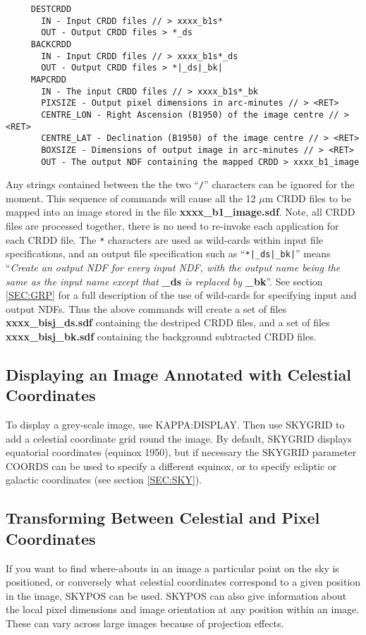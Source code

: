 \small
\begin{verbatim}
     DESTCRDD
       IN - Input CRDD files // > xxxx_b1s*
       OUT - Output CRDD files > *_ds
     BACKCRDD
       IN - Input CRDD files // > xxxx_b1s*_ds
       OUT - Output CRDD files > *|_ds|_bk|
     MAPCRDD
       IN - The input CRDD files // > xxxx_b1s*_bk
       PIXSIZE - Output pixel dimensions in arc-minutes // > <RET>
       CENTRE_LON - Right Ascension (B1950) of the image centre // > <RET>
       CENTRE_LAT - Declination (B1950) of the image centre // > <RET>
       BOXSIZE - Dimensions of output image in arc-minutes // > <RET>
       OUT - The output NDF containing the mapped CRDD > xxxx_b1_image
\end{verbatim}
\normalsize

Any strings contained between the the two ``\verb+/+'' characters can be ignored
for the moment.
This sequence of commands will cause all the 12 $\mu$m {\small CRDD} files to be
mapped into an image stored in the file {\bf xxxx\_b1\_image.sdf}. Note, all
{\small CRDD} files are processed together, there is no need to  re-invoke each
application for each {\small CRDD} file. The \verb+*+ characters are used as
wild-cards within input file specifications, and an output file specification
such as ``\verb+*|_ds|_bk|+'' means ``{\em Create an output {\small NDF} for
every input {\small NDF}, with the output name being the same as the input name
except that} {\bf \_ds} {\em is replaced by} {\bf \_bk}''. See section
\ref{SEC:GRP} for a full description of the use of wild-cards for specifying
input and output {\small NDF}s. Thus the above commands will create a set of
files {\bf xxxx\_bisj\_ds.sdf} containing the destriped {\small CRDD} files, and
a set of files {\bf xxxx\_bisj\_bk.sdf} containing the background subtracted
{\small CRDD} files.

\subsection{Displaying an Image Annotated with Celestial Coordinates}
To display a grey-scale image, use {\small KAPPA:DISPLAY}. Then use {\small
SKYGRID} to add a celestial coordinate grid round the image. By default,
SKYGRID displays equatorial coordinates (equinox 1950), but if necessary the
SKYGRID parameter COORDS can be used to specify a different equinox, or to
specify ecliptic or galactic coordinates (see section \ref{SEC:SKY}).

\subsection{Transforming Between Celestial and Pixel Coordinates}
If you want to find where-abouts in an image a particular point on the sky is
positioned, or conversely what celestial coordinates correspond to a given
position in the image, {\small SKYPOS} can be used. {\small SKYPOS} can also
give information about the local pixel dimensions and image orientation at any
position within an image. These can vary across large images because of
projection effects.

